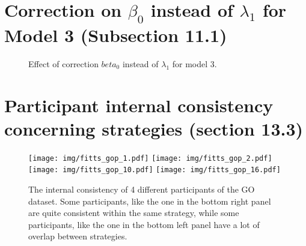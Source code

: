 \documentclass{article}
\begin{document}
\section{Correction on $\beta_0$ instead of $\lambda_1$ for Model 3 (Subsection 11.1)}

\begin{figure}[htbp]
    \centering
    \caption{Effect of correction $beta_0$ instead of $\lambda_1$ for model 3.}
\end{figure}


\section{Participant internal consistency concerning strategies (section 13.3)}

\begin{figure}[htbp]
    \centering
    \texttt{[image: img/fitts\_gop\_1.pdf]}
    \texttt{[image: img/fitts\_gop\_2.pdf]} \\
    \texttt{[image: img/fitts\_gop\_10.pdf]}
    \texttt{[image: img/fitts\_gop\_16.pdf]}
    \caption{The internal consistency of 4 different participants of the GO dataset. Some participants, like the one in the bottom right panel are quite consistent within the same strategy, while some participants, like the one in the bottom left panel have a lot of overlap between strategies.}
\end{figure}
\end{document}
